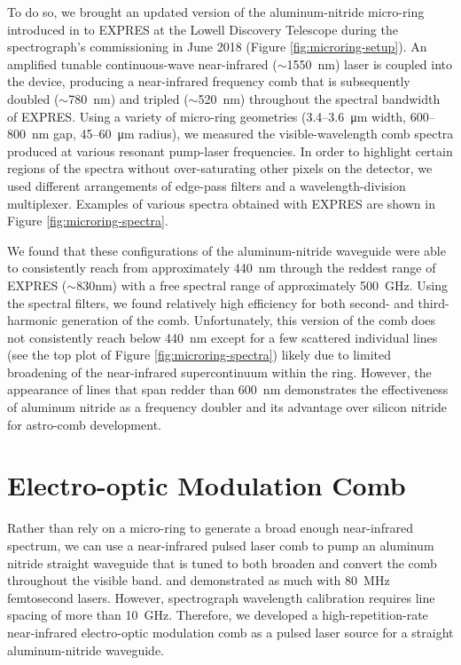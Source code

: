 To do so, we brought an updated version of the aluminum-nitride micro-ring introduced in \citet{jung_green_2014} to EXPRES at the Lowell Discovery Telescope during the spectrograph's commissioning in June 2018 (Figure \ref{fig:microring-setup}). An amplified tunable continuous-wave near-infrared ($\sim$1550~\si{\nano\meter}) laser is coupled into the device, producing a near-infrared frequency comb that is subsequently doubled ($\sim$780~\si{\nano\meter}) and tripled ($\sim$520~\si{\nano\meter}) throughout the spectral bandwidth of EXPRES. Using a variety of micro-ring geometries (3.4--3.6~\si{\micro\meter} width, 600--800~\si{\nano\meter} gap, 45--60~\si{\micro\meter} radius), we measured the visible-wavelength comb spectra produced at various resonant pump-laser frequencies. In order to highlight certain regions of the spectra without over-saturating other pixels on the detector, we used different arrangements of edge-pass filters and a wavelength-division multiplexer. Examples of various spectra obtained with EXPRES are shown in Figure \ref{fig:microring-spectra}.

We found that these configurations of the aluminum-nitride waveguide were able to consistently reach from approximately 440~\si{\nano\meter} through the reddest range of EXPRES ($\sim$830\si{\nano\meter}) with a free spectral range of approximately 500~\si{\giga\hertz}. Using the spectral filters, we found relatively high efficiency for both second- and third-harmonic generation of the comb. Unfortunately, this version of the comb does not consistently reach below 440~\si{\nano\meter} except for a few scattered individual lines (see the top plot of Figure \ref{fig:microring-spectra}) likely due to limited broadening of the near-infrared supercontinuum within the ring. However, the appearance of lines that span redder than 600~\si{\nano\meter} demonstrates the effectiveness of aluminum nitride as a frequency doubler and its advantage over silicon nitride for astro-comb development.

\section{Electro-optic Modulation Comb} \label{astro-comb:eom}

Rather than rely on a micro-ring to generate a broad enough near-infrared spectrum, we can use a near-infrared pulsed laser comb to pump an aluminum nitride straight waveguide that is tuned to both broaden and convert the comb throughout the visible band. \citet{liu_beyond_2019} and \citet{lu_ultraviolet_2020} demonstrated as much with 80~\si{\mega\hertz} femtosecond lasers. However, spectrograph wavelength calibration requires line spacing of more than 10~\si{\giga\hertz}. Therefore, we developed a high-repetition-rate near-infrared electro-optic modulation comb \citep[based designs by][]{beha_electronic_2017, carlson_ultrafast_2017} as a pulsed laser source for a straight aluminum-nitride waveguide.

